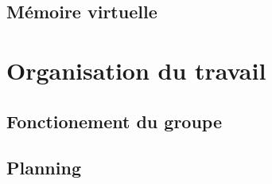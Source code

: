 \documentclass{article}
\begin{document}
	\subsection{Mémoire virtuelle}
		\paragraph{}

\section{Organisation du travail}
	\subsection{Fonctionement du groupe}
	\subsection{Planning}
\end{document}
